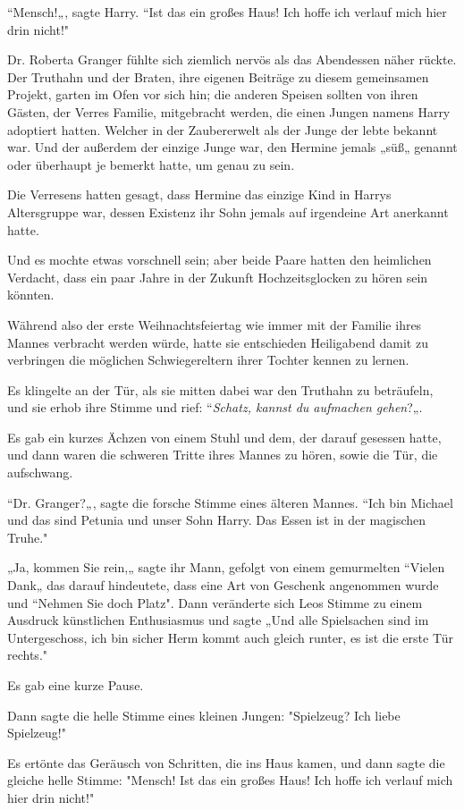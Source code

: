 {“Mensch!„, sagte Harry. “Ist das ein großes Haus! Ich hoffe ich verlauf mich hier drin nicht!"

Dr. Roberta Granger fühlte sich ziemlich nervös als das Abendessen näher rückte. Der Truthahn und der Braten, ihre eigenen Beiträge zu diesem gemeinsamen Projekt, garten im Ofen vor sich hin; die anderen Speisen sollten von ihren Gästen, der Verres Familie, mitgebracht werden, die einen Jungen namens Harry adoptiert hatten. Welcher in der Zaubererwelt als der Junge der lebte bekannt war. Und der außerdem der einzige Junge war, den Hermine jemals „süß„ genannt oder überhaupt je bemerkt hatte, um genau zu sein.

Die Verresens hatten gesagt, dass Hermine das einzige Kind in Harrys Altersgruppe war, dessen Existenz ihr Sohn jemals auf irgendeine Art anerkannt hatte.

Und es mochte etwas vorschnell sein; aber beide Paare hatten den heimlichen Verdacht, dass ein paar Jahre in der Zukunft Hochzeitsglocken zu hören sein könnten.

Während also der erste Weihnachtsfeiertag wie immer mit der Familie ihres Mannes verbracht werden würde, hatte sie entschieden Heiligabend damit zu verbringen die möglichen Schwiegereltern ihrer Tochter kennen zu lernen.

Es klingelte an der Tür, als sie mitten dabei war den Truthahn zu beträufeln, und sie erhob ihre Stimme und rief: “\emph{Schatz, kannst du aufmachen gehen}?„.

Es gab ein kurzes Ächzen von einem Stuhl und dem, der darauf gesessen hatte, und dann waren die schweren Tritte ihres Mannes zu hören, sowie die Tür, die aufschwang.

“Dr. Granger?„, sagte die forsche Stimme eines älteren Mannes. “Ich bin Michael und das sind Petunia und unser Sohn Harry. Das Essen ist in der magischen Truhe."

„Ja, kommen Sie rein,„ sagte ihr Mann, gefolgt von einem gemurmelten “Vielen Dank„ das darauf hindeutete, dass eine Art von Geschenk angenommen wurde und “Nehmen Sie doch Platz". Dann veränderte sich Leos Stimme zu einem Ausdruck künstlichen Enthusiasmus und sagte „Und alle Spielsachen sind im Untergeschoss, ich bin sicher Herm kommt auch gleich runter, es ist die erste Tür rechts."

Es gab eine kurze Pause.

Dann sagte die helle Stimme eines kleinen Jungen: "Spielzeug? Ich liebe Spielzeug!"

Es ertönte das Geräusch von Schritten, die ins Haus kamen, und dann sagte die gleiche helle Stimme: "Mensch! Ist das ein großes Haus! Ich hoffe ich verlauf mich hier drin nicht!"

}
